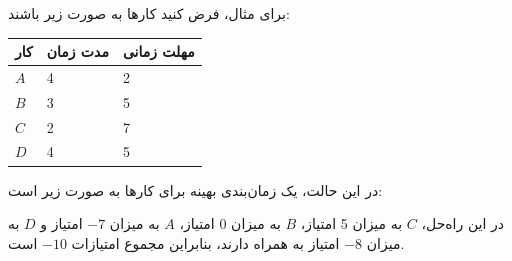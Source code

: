 برای مثال، فرض کنید کارها به صورت زیر باشند:
\begin{center}
\begin{tabular}{lll}
کار & مدت زمان & مهلت زمانی \\
\hline
$A$ & 4 & 2 \\
$B$ & 3 & 5 \\
$C$ & 2 & 7 \\
$D$ & 4 & 5 \\
\end{tabular}
\end{center}
در این حالت، یک زمان‌بندی بهینه برای کارها به صورت زیر است:
\begin{center}
\end{center}
در این راه‌حل، $C$ به میزان 5 امتیاز، $B$ به میزان 0 امتیاز، $A$ به میزان $-7$ امتیاز و $D$ به میزان $-8$ امتیاز به همراه دارند، بنابراین مجموع امتیازات $-10$ است.

